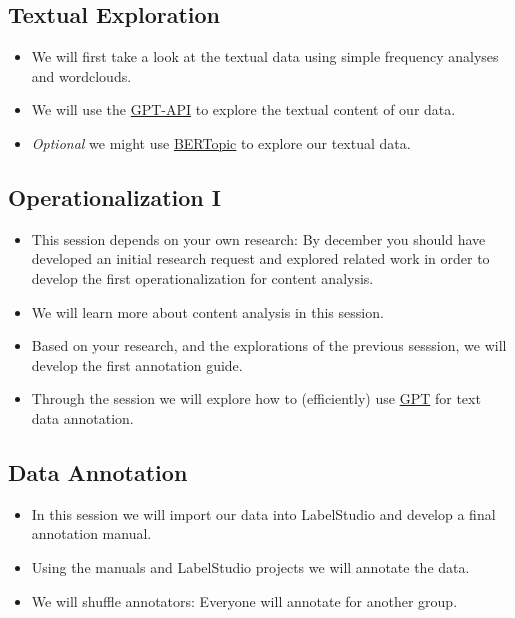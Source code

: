 \documentclass[
  letterpaper,
  DIV=11,
  numbers=noendperiod]{scrartcl}
\providecommand{\tightlist}{%
  \setlength{\itemsep}{0pt}\setlength{\parskip}{0pt}}\usepackage{longtable,booktabs,array}
\begin{document}
\hypertarget{textual-exploration}{%
\subsection{Textual Exploration}\label{textual-exploration}}

\begin{itemize}
\tightlist
\item
  We will first take a look at the textual data using simple frequency
  analyses and wordclouds.
\item
  We will use the
  \href{https://platform.openai.com/docs/guides/gpt/chat-completions-api}{GPT-API}
  to explore the textual content of our data.
\item
  \emph{Optional} we might use
  \href{https://maartengr.github.io/BERTopic/index.html}{BERTopic} to
  explore our textual data.
\end{itemize}

\hypertarget{operationalization-i}{%
\subsection{Operationalization I}\label{operationalization-i}}

\begin{itemize}
\tightlist
\item
  This session depends on your own research: By december you should have
  developed an initial research request and explored related work in
  order to develop the first operationalization for content analysis.
\item
  We will learn more about content analysis in this session.
\item
  Based on your research, and the explorations of the previous sesssion,
  we will develop the first annotation guide.
\item
  Through the session we will explore how to (efficiently) use
  \href{https://platform.openai.com/docs/guides/gpt/chat-completions-api}{GPT}
  for text data annotation.
\end{itemize}

\hypertarget{data-annotation}{%
\subsection{Data Annotation}\label{data-annotation}}

\begin{itemize}
\tightlist
\item
  In this session we will import our data into LabelStudio and develop a
  final annotation manual.
\item
  Using the manuals and LabelStudio projects we will annotate the data.
\item
  We will shuffle annotators: Everyone will annotate for another group.
\end{itemize}
\end{document}
